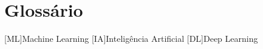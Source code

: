 \chapter{Glossário}

\footnotesize
\SingleSpacing

\begin{multicols}{2}
\begin{acronym}[AAAAAA]

	[ML]{Machine Learning}
	[IA]{Inteligência Artificial}
	[DL]{Deep Learning}

\end{acronym}
\end{multicols}

